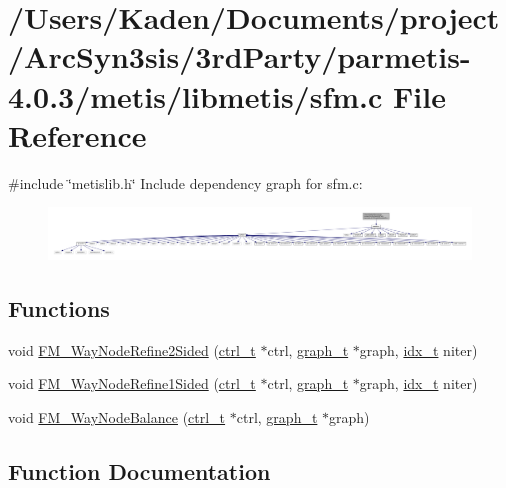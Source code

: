 \hypertarget{a00275}{}\section{/\+Users/\+Kaden/\+Documents/project/\+Arc\+Syn3sis/3rd\+Party/parmetis-\/4.0.3/metis/libmetis/sfm.c File Reference}
\label{a00275}
{\ttfamily \#include \char`\"{}metislib.\+h\char`\"{}}\newline
Include dependency graph for sfm.\+c\+:\nopagebreak
\begin{figure}[H]
\begin{center}
\leavevmode
\includegraphics[width=350pt]{a00276}
\end{center}
\end{figure}
\subsection*{Functions}
\begin{DoxyCompactItemize}
\item 
void \hyperlink{a00275_ac1ce8eab68ef8a71c0a5097be9af5094}{F\+M\+\_\+Way\+Node\+Refine2\+Sided} (\hyperlink{a00742}{ctrl\+\_\+t} $\ast$ctrl, \hyperlink{a00734}{graph\+\_\+t} $\ast$graph, \hyperlink{a00876_aaa5262be3e700770163401acb0150f52}{idx\+\_\+t} niter)
\item 
void \hyperlink{a00275_a7e2e4362953c8c68c6af01bfcb87d8e1}{F\+M\+\_\+Way\+Node\+Refine1\+Sided} (\hyperlink{a00742}{ctrl\+\_\+t} $\ast$ctrl, \hyperlink{a00734}{graph\+\_\+t} $\ast$graph, \hyperlink{a00876_aaa5262be3e700770163401acb0150f52}{idx\+\_\+t} niter)
\item 
void \hyperlink{a00275_a16e9d1c55ba5492b7203c98ef4a6d886}{F\+M\+\_\+Way\+Node\+Balance} (\hyperlink{a00742}{ctrl\+\_\+t} $\ast$ctrl, \hyperlink{a00734}{graph\+\_\+t} $\ast$graph)
\end{DoxyCompactItemize}


\subsection{Function Documentation}
\mbox{\label{a00275_a16e9d1c55ba5492b7203c98ef4a6d886}} 
